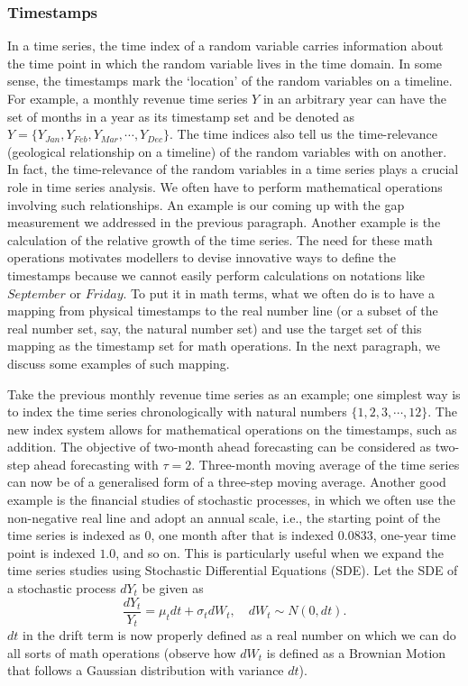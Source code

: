 \subsubsection{Timestamps}
In a time series, the time index of a random variable carries information about the time point in which the random variable lives in the time domain. In some sense, the timestamps mark the `location' of the random variables on a timeline. For example, a monthly revenue time series $Y$ in an arbitrary year can have the set of months in a year as its timestamp set and be denoted as $Y = \{ Y_{Jan}, Y_{Feb}, Y_{Mar}, \cdots, Y_{Dec} \}$. The time indices also tell us the time-relevance (geological relationship on a timeline) of the random variables with on another. In fact, the time-relevance of the random variables in a time series plays a crucial role in time series analysis. We often have to perform mathematical operations involving such relationships. An example is our coming up with the gap measurement we addressed in the previous paragraph. Another example is the calculation of the relative growth of the time series. The need for these math operations motivates modellers to devise innovative ways to define the timestamps because we cannot easily perform calculations on notations like $September$ or $Friday$. To put it in math terms, what we often do is to have a mapping from physical timestamps to the real number line (or a subset of the real number set, say, the natural number set) and use the target set of this mapping as the timestamp set for math operations. In the next paragraph, we discuss some examples of such mapping.

Take the previous monthly revenue time series as an example; one simplest way is to index the time series chronologically with natural numbers $\{ 1, 2, 3, \cdots, 12 \}$. The new index system allows for mathematical operations on the timestamps, such as addition. The objective of two-month ahead forecasting can be considered as two-step ahead forecasting with $\tau = 2$. Three-month moving average of the time series can now be of a generalised form of a three-step moving average. Another good example is the financial studies of stochastic processes, in which we often use the non-negative real line and adopt an annual scale, i.e., the starting point of the time series is indexed as $0$, one month after that is indexed $0.0833$, one-year time point is indexed $1.0$, and so on. This is particularly useful when we expand the time series studies using Stochastic Differential Equations (SDE). Let the SDE of a stochastic process $dY_t$ be given as
\begin{equation*}
    \frac{dY_t}{Y_t} = \mu_t dt + \sigma_t dW_t, \quad dW_t \sim N(0, dt).
\end{equation*}
$dt$ in the drift term is now properly defined as a real number on which we can do all sorts of math operations (observe how $dW_t$ is defined as a Brownian Motion that follows a Gaussian distribution with variance $dt$).

